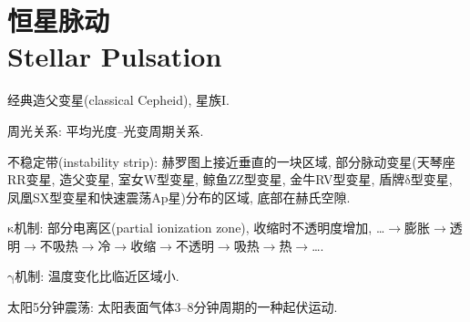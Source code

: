 \chapter{恒星脉动\\Stellar Pulsation}

经典造父变星(classical Cepheid), 星族I.

周光关系: 平均光度--光变周期关系.

不稳定带(instability strip): 赫罗图上接近垂直的一块区域, 部分脉动变星(天琴座RR变星, 造父变星, 室女W型变星, 鲸鱼ZZ型变星, 金牛RV型变星, 盾牌$\mathrm{\delta}$型变星, 凤凰SX型变星和快速震荡Ap星)分布的区域, 底部在赫氏空隙.

$\mathrm{\kappa}$机制: 部分电离区(partial ionization zone), 收缩时不透明度增加, \dots$\to$膨胀$\to$透明$\to$不吸热$\to$冷$\to$收缩$\to$不透明$\to$吸热$\to$热$\to$\dots.

$\mathrm{\gamma}$机制: 温度变化比临近区域小.

太阳5分钟震荡: 太阳表面气体3--8分钟周期的一种起伏运动.
